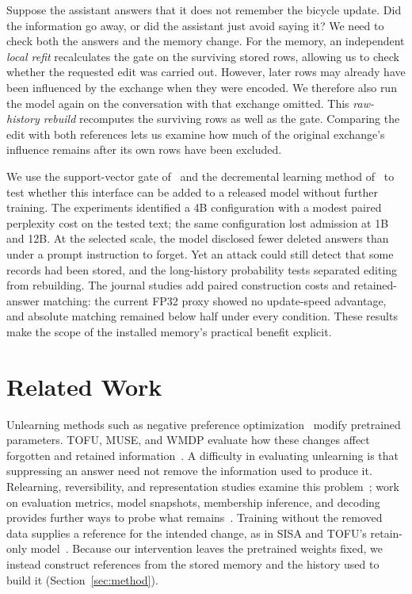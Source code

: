 Suppose the assistant answers that it does not remember the bicycle update.
Did the information go away, or did the assistant just avoid saying it? We
need to check both the answers and the memory change. For the memory, an
independent \emph{local refit} recalculates the gate on the surviving stored
rows, allowing us to check whether the requested edit was carried out.
However, later rows may already have been influenced by the exchange when
they were encoded. We therefore also run the model again on the conversation
with that exchange omitted. This \emph{raw-history rebuild} recomputes the
surviving rows as well as the gate. Comparing the edit with both references
lets us examine how much of the original exchange's influence remains after
its own rows have been excluded.

We use the support-vector gate of~\citet{svattn} and the decremental learning
method of~\citet{cp2000} to test whether this interface can be added to a
released model without further training. The experiments identified a 4B
configuration with a modest paired perplexity cost on the tested text; the
same configuration lost admission at 1B and 12B. At the selected scale, the
model disclosed fewer deleted answers than under a prompt instruction to
forget. Yet an attack could still detect that some records had been stored,
and the long-history probability tests separated editing from rebuilding.
The journal studies add paired construction costs and retained-answer matching:
the current FP32 proxy showed no update-speed advantage, and absolute matching
remained below half under every condition. These results make the scope of the
installed memory's practical benefit explicit.

\section{Related Work}\label{sec:related}

Unlearning methods such as negative preference
optimization~\citep{zhang2024npo} modify pretrained parameters. TOFU, MUSE,
and WMDP evaluate how these changes affect forgotten and retained
information~\citep{tofu,muse,wmdp}. A difficulty in evaluating unlearning is
that suppressing an answer need not remove the information used to produce
it. Relearning, reversibility, and representation studies examine this
problem~\citep{relearn,reversibility,thaker}; work on evaluation metrics,
model snapshots, membership inference, and decoding provides further ways
to probe what remains~\citep{lynch,snapshot,lira,leakk}. Training without the
removed data supplies a reference for the intended change, as in SISA and
TOFU's retain-only model~\citep{sisa,tofu}. Because our intervention leaves
the pretrained weights fixed, we instead construct references from the
stored memory and the history used to build it (Section~\ref{sec:method}).

